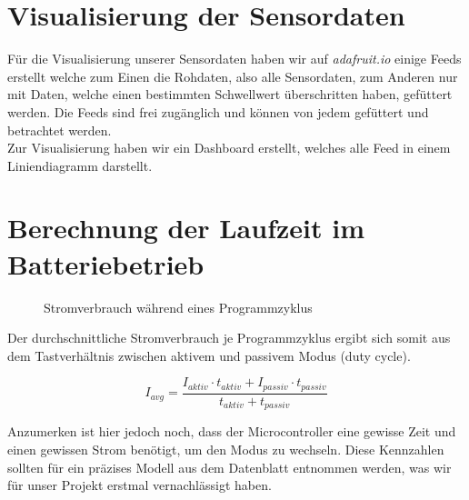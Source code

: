 \section{Visualisierung der Sensordaten} \label{Dashboard und Visualisierung}

Für die Visualisierung unserer Sensordaten haben wir auf \textit{adafruit.io} einige Feeds erstellt welche zum Einen die Rohdaten, also alle Sensordaten, zum Anderen nur mit Daten, welche einen bestimmten Schwellwert überschritten haben, gefüttert werden. Die Feeds sind frei zugänglich und können von jedem gefüttert und betrachtet werden.\\
Zur Visualisierung haben wir ein Dashboard erstellt, welches alle Feed in einem Liniendiagramm darstellt.

\newpage


\section{Berechnung der Laufzeit im Batteriebetrieb} \label{Simulation}

\begin{center}
	\begin{figure}[h]
	 
	 \noindent{}
	 \caption[Stromverbrauch während eines Programmzyklus]{Stromverbrauch während eines Programmzyklus}
	 \label{fig:stromzyklus}
	\end{figure}
\end{center}

Der durchschnittliche Stromverbrauch je Programmzyklus ergibt sich somit aus dem Tastverhältnis zwischen aktivem und passivem Modus (duty cycle).

\[I_{avg} = \frac{I_{aktiv}\cdot t_{aktiv} + I_{passiv} \cdot t_{passiv}}{t_{aktiv} + t_{passiv}}\]

Anzumerken ist hier jedoch noch, dass der Microcontroller eine gewisse Zeit und einen gewissen Strom benötigt, um den Modus zu wechseln. Diese Kennzahlen sollten für ein präzises Modell aus dem Datenblatt entnommen werden, was wir für unser Projekt erstmal vernachlässigt haben.

